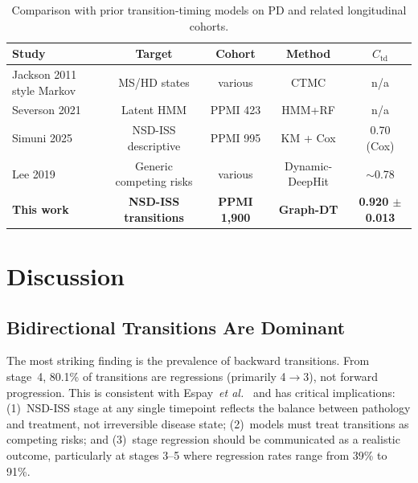 \begin{table}[t]
\centering
\caption{Comparison with prior transition-timing models on PD and related longitudinal cohorts.}
\label{p3:tab:competitors}
\footnotesize
\begin{tabular}{@{}lcccc@{}}
\toprule
Study & Target & Cohort & Method & $C_{\text{td}}$ \\
\midrule
Jackson 2011~\cite{jackson2011} style Markov & MS/HD states            & various & CTMC       & n/a \\
Severson 2021~\cite{severson2021}             & Latent HMM              & PPMI 423 & HMM+RF     & n/a \\
Simuni 2025~\cite{simuni2025}                 & NSD-ISS descriptive     & PPMI 995 & KM + Cox   & 0.70 (Cox) \\
Lee 2019~\cite{lee2019}                       & Generic competing risks & various  & Dynamic-DeepHit & $\sim$0.78 \\
\textbf{This work}                            & \textbf{NSD-ISS transitions} & \textbf{PPMI 1{,}900} & \textbf{Graph-DT} & \textbf{0.920 $\pm$ 0.013} \\
\bottomrule
\end{tabular}
\end{table}

\section{Discussion}
\label{p3:sec:discussion}

\subsection{Bidirectional Transitions Are Dominant}

The most striking finding is the prevalence of backward transitions. From stage~4, 80.1\% of transitions are regressions (primarily 4$\to$3), not forward progression. This is consistent with Espay~\textit{et al.}~\cite{espay2025} and has critical implications: (1)~NSD-ISS stage at any single timepoint reflects the balance between pathology and treatment, not irreversible disease state; (2)~models must treat transitions as competing risks; and (3)~stage regression should be communicated as a realistic outcome, particularly at stages 3--5 where regression rates range from 39\% to 91\%.

